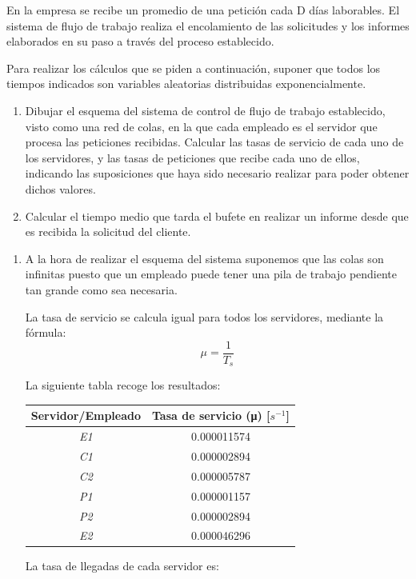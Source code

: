 \begin{problem}[21]
En la empresa se recibe un promedio de una petición cada D días laborables.
El sistema de flujo de trabajo realiza el encolamiento de las solicitudes y los informes elaborados en su paso a través del proceso establecido.

Para realizar los cálculos que se piden a continuación, suponer que todos los tiempos indicados son variables aleatorias distribuidas exponencialmente.
\begin{enumerate}
\item Dibujar el esquema del sistema de control de flujo de trabajo establecido, visto como una red de colas, en la que cada empleado es el servidor que procesa las peticiones recibidas. Calcular las tasas de servicio de cada uno de los servidores, y las tasas de peticiones que recibe cada uno de ellos, indicando las suposiciones que haya sido necesario realizar para poder obtener dichos valores.
\item Calcular el tiempo medio que tarda el bufete en realizar un informe desde que es recibida la solicitud del cliente.
\end{enumerate}

\solution
\begin{enumerate}
\item


A la hora de realizar el esquema del sistema suponemos que las colas son infinitas puesto que un empleado puede tener una pila de trabajo pendiente tan grande como sea necesaria.

La tasa de servicio se calcula igual para todos los servidores, mediante la fórmula:
\[μ = \frac{1}{T_s}\]

La siguiente tabla recoge los resultados:


\begin{center}
\begin{tabular}{| c |  c |}
\hline
  \textbf{Servidor/Empleado}  & \textbf{Tasa de servicio (μ) [$s^{-1}$]}\\
\hline
 \textit{E1}& 0.000011574\\
 \textit{C1}& 0.000002894\\
 \textit{C2}& 0.000005787\\
 \textit{P1}& 0.000001157\\
 \textit{P2}& 0.000002894\\
 \textit{E2}& 0.000046296\\
\hline
\end{tabular}
\end{center}

La tasa de llegadas de cada servidor es:


\end{enumerate}
\end{problem}
